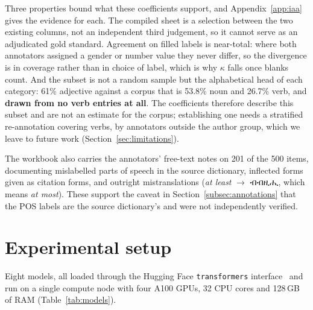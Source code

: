 \documentclass[11pt]{article}
\newcommand{\ti}[1]{{\geezfont #1}}
\newcommand{\ti}[1]{\texttt{[ge'ez]}}
\begin{document}
Three properties bound what these coefficients support, and
Appendix~\ref{app:iaa} gives the evidence for each. The compiled sheet is a
selection between the two existing columns, not an independent third
judgement, so it cannot serve as an adjudicated gold standard. Agreement on
filled labels is near-total: where both annotators assigned a gender or
number value they never differ, so the divergence is in coverage rather than
in choice of label, which is why $\kappa$ falls once blanks count. And the
subset is not a random sample but the alphabetical head of each category:
61\% adjective against a corpus that is 53.8\% noun and 26.7\% verb, and
\textbf{drawn from no verb entries at all}. The coefficients therefore
describe this subset and are not an estimate for the corpus; establishing one
needs a stratified re-annotation covering verbs, by annotators outside the
author group, which we leave to future work (Section~\ref{sec:limitations}).

The workbook also carries the annotators' free-text notes on 201 of the 500
items, documenting mislabelled parts of speech in the source dictionary,
inflected forms given as citation forms, and outright mistranslations
(\emph{at least} $\rightarrow$ \ti{ብብዚሒ}, which means \emph{at most}). These
support the caveat in Section~\ref{subsec:annotations} that the POS labels are
the source dictionary's and were not independently verified.

\section{Experimental setup}
\label{sec:setup}

Eight models, all loaded through the Hugging Face \texttt{transformers}
interface~\citep{wolf-etal-2020-transformers} and run on a single compute
node with four A100 GPUs, 32 CPU cores and 128\,GB of RAM
(Table~\ref{tab:models}).
\end{document}
